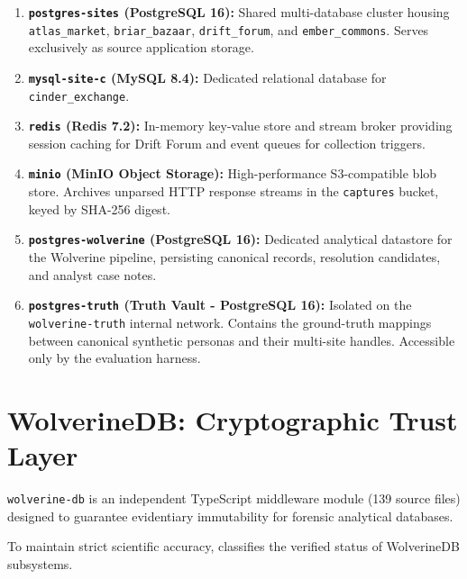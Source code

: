 \begin{enumerate}
    \item \textbf{\texttt{postgres-sites} (PostgreSQL 16):} Shared multi-database cluster housing \texttt{atlas\_market}, \texttt{briar\_bazaar}, \texttt{drift\_forum}, and \texttt{ember\_commons}. Serves exclusively as source application storage.
    \item \textbf{\texttt{mysql-site-c} (MySQL 8.4):} Dedicated relational database for \texttt{cinder\_exchange}.
    \item \textbf{\texttt{redis} (Redis 7.2):} In-memory key-value store and stream broker providing session caching for Drift Forum and event queues for collection triggers.
    \item \textbf{\texttt{minio} (MinIO Object Storage):} High-performance S3-compatible blob store. Archives unparsed HTTP response streams in the \texttt{captures} bucket, keyed by SHA-256 digest.
    \item \textbf{\texttt{postgres-wolverine} (PostgreSQL 16):} Dedicated analytical datastore for the Wolverine pipeline, persisting canonical records, resolution candidates, and analyst case notes.
    \item \textbf{\texttt{postgres-truth} (Truth Vault - PostgreSQL 16):} Isolated on the \texttt{wolverine-truth} internal network. Contains the ground-truth mappings between canonical synthetic personas and their multi-site handles. Accessible only by the evaluation harness.
\end{enumerate}

\section{WolverineDB: Cryptographic Trust Layer}
\label{sec:data-wolverinedb}
\texttt{wolverine-db} is an independent TypeScript middleware module (139 source files) designed to guarantee evidentiary immutability for forensic analytical databases.

To maintain strict scientific accuracy,  classifies the verified status of WolverineDB subsystems.

